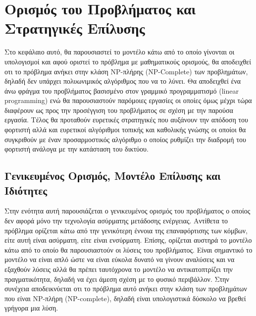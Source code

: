 

\chapter{Ορισμός του Προβλήματος και Στρατηγικές Επίλυσης} \label{ch:strategies_solution}
Στο κεφάλαιο αυτό, θα παρουσιαστεί το μοντέλο κάτω από το οποίο γίνονται οι υπολογισμοί και αφού οριστεί το πρόβλημα με μαθηματικούς ορισμούς, θα αποδειχθεί οτι το
πρόβλημα ανήκει στην κλάση NP-πλήρης (NP-Complete) των προβλημάτων, δηλαδή δεν υπάρχει πολυωνιμικός αλγόριθμος που να το λύνει. Θα αποδειχθεί ένα άνω φράγμα του
προβλήματος βασισμένο στον γραμμικό προγραμματισμό (linear programming) ενώ θα παρουσιαστούν παρόμοιες εργασίες οι οποίες όμως μέχρι τώρα διαφέρουν ως προς την
προσέγγιση του προβλήματος σε σχέση με την παρούσα εργασία. Τέλος θα προταθούν ευρετικές στρατηγικές που αυξάνουν την απόδοση του φορτιστή αλλά και ευρετικοί
αλγόριθμοι τοπικής και καθολικής γνώσης οι οποίοι θα συγκριθούν με έναν προσαρμοστικός αλγόριθμο ο οποίος ρυθμίζει την διαδρομή του φορτιστή ανάλογα με την κατάσταση
του δικτύου.


\section{Γενικευμένος Ορισμός, Μοντέλο Επίλυσης και Ιδιότητες}
Στην ενότητα αυτή παρουσιάζεται ο γενικευμένος ορισμός του προβλήματος ο οποίος δεν αφορά μόνο την τεχνολογία ασύρματης μετάδοσης ενέργειας. Αντίθετα το πρόβλημα
ορίζεται κάτω από την γενικότερη έννοια της επαναφόρτισης των κόμβων, είτε αυτή είναι ασύρματη, είτε είναι ενσύρματη. Επίσης, ορίζεται αυστηρά το μοντέλο κάτω από το
οποίο θα παρουσιαστούν οι λύσεις του προβλήματος. Είναι σημαντικό το μοντέλο να είναι απλό ώστε να είναι εύκολα δυνατό να γίνουν αναλύσεις και να εξαχθούν λύσεις
αλλά θα πρέπει ταυτόχρονα το μοντέλο να αντικατοπτρίζει την πραγματικότητα, δηλαδή να έχει άμεση σχέση με το φυσικό περιβάλλον. Στην συνέχεια αποδεικνύεται οτι το
πρόβλημα αυτό ανήκει στην κλάση των προβλημάτων που είναι NP-πλήρη (NP-complete), δηλαδή είναι υπολογιστικά δύσκολο να βρεθεί γρήγορα μια λύση.

